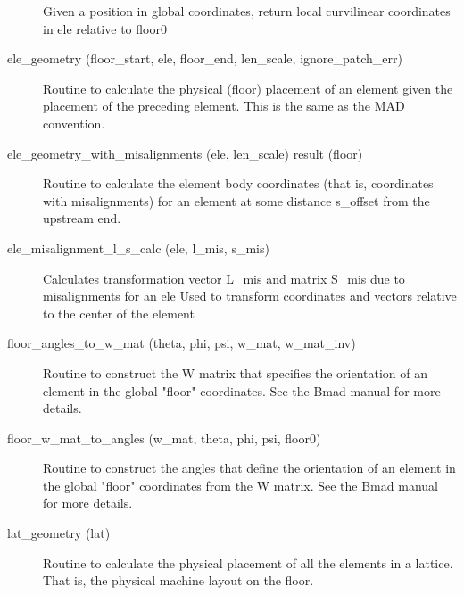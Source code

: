 \begin{description}
\label{r:position.in.local.frame}
\item[\protect\parbox{6in}{
    coords_floor_to_local_curvilinear(global_position, ele, status, w_mat, \\
    \hspace*{1in} relative_to) result(local_position) }] \Newline 
Given a position in global coordinates, return local curvilinear coordinates in ele
  relative to floor0

\label{r:ele.geometry}
\item[ele_geometry (floor_start, ele, floor_end, len_scale, ignore_patch_err)] \Newline 
Routine to calculate the physical (floor) placement of an element given the
placement of the preceding element. This is the same as the MAD convention.

\label{r:ele.geometry.with.misalignments}
\item[ele_geometry_with_misalignments (ele, len_scale) result (floor)] \Newline 
Routine to calculate the element body coordinates (that is, coordinates with misalignments) 
for an element at some distance s_offset from the upstream end.

\label{r:ele.misalignment.l.s.calc}
\item[ele_misalignment_l_s_calc (ele, l_mis, s_mis)] \Newline 
Calculates transformation vector L_mis and matrix S_mis due to misalignments for an ele
Used to transform coordinates and vectors relative to the center of the element

\label{r:floor.angles.to.w.mat}
\item[floor_angles_to_w_mat (theta, phi, psi, w_mat, w_mat_inv)] \Newline 
Routine to construct the W matrix that specifies the orientation of an element
in the global "floor" coordinates. See the Bmad manual for more details.

\label{r:floor.w.mat.to.angles}
\item[floor_w_mat_to_angles (w_mat, theta, phi, psi, floor0)] \Newline 
Routine to construct the angles that define the orientation of an element
in the global "floor" coordinates from the W matrix. See the Bmad manual for more details.

\label{r:lat.geometry}
\item[lat_geometry (lat)] \Newline
Routine to calculate the physical placement of all the elements in a lattice. 
That is, the physical machine layout on the floor. 


\end{description}
